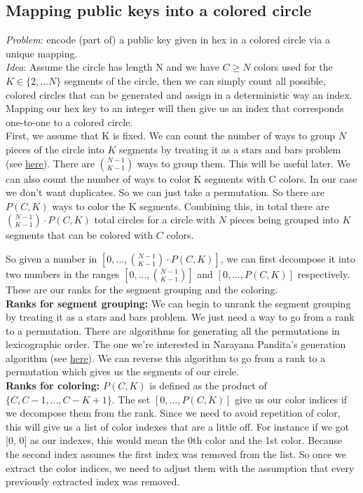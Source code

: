 \documentclass[a4paper,12pt]{article}
\begin{document}
\subsection*{Mapping public keys into a colored circle}

\textit{Problem}: encode (part of) a public key given in hex in a colored circle via a unique mapping.\\

\textit{Idea}: 
Assume the circle has length N and we have $C \geq N$ colors used for the $K \in \{2,...N\}$ segments of the circle, then we can simply count all possible, colored circles that can be generated and assign in a deterministic way an index. Mapping our hex key to an integer will then give us an index that corresponds one-to-one to a colored circle.\\

First, we assume that K is fixed.
We can count the number of ways to group $N$ pieces of the circle into $K$ segments by treating it as a stars and bars problem (see \href{https://en.wikipedia.org/wiki/Stars_and_bars_(combinatorics)}{here}). There are ${N-1 \choose K-1}$ ways to group them. This will be useful later.
We can also count the number of ways to color K segments with C colors. In our case we don't want duplicates. So we can just take a permutation. So there are $P(C,K)$ ways to color the K segments.
Combining this, in total there are ${N-1 \choose K-1} \cdot P(C,K)$ total circles for a circle with $N$ pieces being grouped into $K$ segments that can be colored with $C$ colors.

So given a number in $ [ 0,..., {N-1 \choose K-1} \cdot P(C,K) ] $, we can first decompose it into two numbers in the ranges $[0,..., {N-1 \choose K-1}]$ and $[0,..., P(C,K)]$ respectively. These are our ranks for the segment grouping and the coloring.\\
    
\textbf{Ranks for segment grouping:} We can begin to unrank the segment grouping by treating it as a stars and bars problem. We just need a way to go from a rank to a permutation. There are algorithms for generating all the permutations in lexicographic order. The one we're interested in Narayana Pandita's generation algorithm (see \href{https://en.wikipedia.org/wiki/Permutation#Generation_in_lexicographic_order}{here}). We can reverse this algorithm to go from a rank to a permutation which gives us the segments of our circle.\\
    
 \textbf{Ranks for coloring:} $P(C,K)$ is defined as the product of $\{C, C-1, ..., C - K + 1\}$. The set $[0,...,P(C,K)]$ give us our color indices if we decompose them from the rank. Since we need to avoid repetition of color, this will give us a list of color indexes that are a little off. For instance if we got [0, 0] as our indexes, this would mean the 0th color and the 1st color. Because the second index assumes the first index was removed from the list. So once we extract the color indices, we need to adjust them with the assumption that every previously extracted index was removed.\\
    
\end{document}
